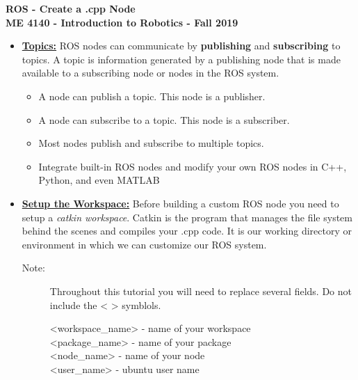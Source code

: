 \documentclass[12pt]{article}
\newcommand{\R}{\color{red}}
\newcommand{\B}{\color{blue}}
\newcommand{\K}{\color{black}}
\newcommand{\G}{\color{mygreen}}
\newcommand{\PR}{\color{mypurple}}
\newcommand{\usrname}{\B<user\_name>\K}
\newcommand{\pkgname}{\G<package\_name>\K}
\newcommand{\wspname}{\R<workspace\_name>\K}
\newcommand{\nodname}{\PR<node\_name>\K}
\begin{document}
\thispagestyle{plain}

\begin{center}
   {\bf \Large ROS - Create a .cpp Node}\vspace{2mm} \\
   {\bf \large ME 4140 - Introduction to Robotics - Fall 2019} \vspace{5mm}\\
\end{center}

\begin{itemize}
    \item  \href{http://wiki.ros.org/Topics}{\bf Topics:} ROS nodes can communicate by {\bf publishing} and {\bf subscribing} to topics. A topic is information generated by a publishing node that is made available to a subscribing node or nodes in the ROS system.
        
        \begin{itemize}		
            \item A node can publish a topic. This node is a publisher.    	
            \item A node can subscribe to a topic. This node is a subscriber.
            \item Most nodes publish and subscribe to multiple topics. 
            \item Integrate built-in ROS nodes and modify your own ROS nodes in C++, Python, and even MATLAB
            
        \end{itemize}

	\item \href{http://wiki.ros.org/catkin/Tutorials/create_a_workspace}{\bf Setup the Workspace:} Before building a custom ROS node you need to setup a {\it catkin workspace}. Catkin is the program that manages the file system behind the scenes and compiles your .cpp code. It is our working directory or environment in which we can customize our ROS system.

	\begin{description}

		\item[Note:] Throughout this tutorial you will need to replace several fields. Do not include the < > symblols.
	
         \wspname \hspace{2mm} - name of your workspace \\
             \pkgname \hspace{2mm} - name of your package \\
            \nodname \hspace{2mm} - name of your node \\
		\usrname \hspace{2mm} - ubuntu user name\\
            




\end{description}
\end{itemize}
\end{document}
